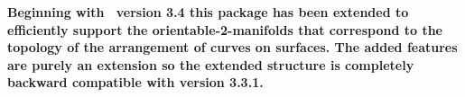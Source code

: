 
{\bf\ttfamily
Beginning with \cgal\ version 3.4 this package has been extended
to efficiently support the orientable-2-manifolds that correspond to the topology 
of the arrangement of curves on surfaces.
The added features are purely an extension so the extended structure is completely 
backward compatible with version 3.3.1.
}
